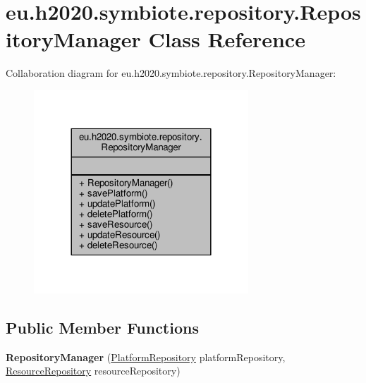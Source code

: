 \hypertarget{classeu_1_1h2020_1_1symbiote_1_1repository_1_1RepositoryManager}{}\section{eu.\+h2020.\+symbiote.\+repository.\+Repository\+Manager Class Reference}
\label{classeu_1_1h2020_1_1symbiote_1_1repository_1_1RepositoryManager}


Collaboration diagram for eu.\+h2020.\+symbiote.\+repository.\+Repository\+Manager\+:
\nopagebreak
\begin{figure}[H]
\begin{center}
\leavevmode
\includegraphics[width=228pt]{classeu_1_1h2020_1_1symbiote_1_1repository_1_1RepositoryManager__coll__graph}
\end{center}
\end{figure}
\subsection*{Public Member Functions}
\begin{DoxyCompactItemize}
\item 
\mbox{\label{classeu_1_1h2020_1_1symbiote_1_1repository_1_1RepositoryManager_a75d70aebe267b3b304ef708547996e5a}} 
{\bfseries Repository\+Manager} (\hyperlink{interfaceeu_1_1h2020_1_1symbiote_1_1repository_1_1PlatformRepository}{Platform\+Repository} platform\+Repository, \hyperlink{interfaceeu_1_1h2020_1_1symbiote_1_1repository_1_1ResourceRepository}{Resource\+Repository} resource\+Repository)
\end{DoxyCompactItemize}
